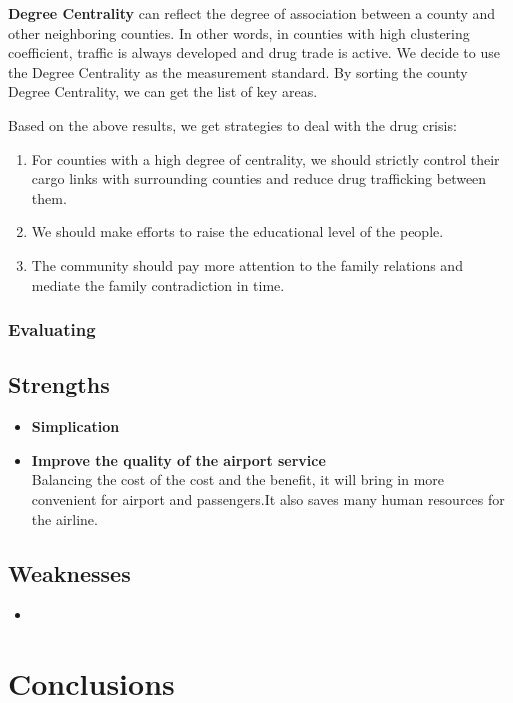 \documentclass{mcmthesis}
\begin{document}
\textbf{Degree Centrality} can reflect the degree of association between a county and other neighboring counties. In other words, in counties with high clustering coefficient, traffic is always developed and drug trade is active. We decide to use the Degree Centrality as the measurement standard. By sorting the county Degree Centrality, we can get the list of key areas.

Based on the above results, we get strategies to deal with the drug crisis:

\begin{enumerate}
	\item For counties with a high degree of centrality, we should strictly control their cargo links with surrounding counties and reduce drug trafficking between them.
	\item We should make efforts to raise the educational level of the people.
	\item The community should pay more attention to the family relations and mediate the family contradiction in time.
\end{enumerate}

\subsubsection{Evaluating}

\subsection{Strengths}
\begin{itemize}
	\item \textbf{Simplication}\\
	
	\item \textbf{Improve the quality of the airport service}\\
	Balancing the cost of the cost and the benefit, it will bring in
	more convenient  for airport and passengers.It also saves many
	human resources for the airline.
\end{itemize}

\subsection{Weaknesses}
\begin{itemize}
	\item
\end{itemize}

\section{Conclusions}
\end{document}
